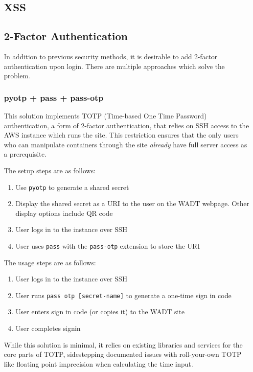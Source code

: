 \documentclass[12pt]{article}
\begin{document}

\subsection{XSS}

\subsection{2-Factor Authentication}
In addition to previous security methods, it is desirable to add 2-factor authentication upon login. There are multiple approaches which solve the problem.

\subsubsection{pyotp + pass + pass-otp}
This solution implements TOTP (Time-based One Time Password) authentication, a form of 2-factor authentication, that relies on SSH access to the AWS instance which runs the site. This restriction ensures that the only users who can manipulate containers through the site \textit{already} have full server access as a prerequisite.

The setup steps are as follows:
\begin{enumerate}
	\item Use \texttt{pyotp} to generate a shared secret
	\item Display the shared secret as a URI to the user on the WADT webpage. Other display options include QR code
	\item User logs in to the instance over SSH
	\item User uses \texttt{pass} with the \texttt{pass-otp} extension to store the URI
\end{enumerate}

The usage steps are as follows:
\begin{enumerate}
	\item User logs in to the instance over SSH
	\item User runs \texttt{pass otp [secret-name]} to generate a one-time sign in code
	\item User enters sign in code (or copies it) to the WADT site
	\item User completes signin
\end{enumerate}

While this solution is minimal, it relies on existing libraries and services for the core parts of TOTP, sidestepping documented issues with roll-your-own TOTP like floating point imprecision when calculating the time input.
\end{document}
